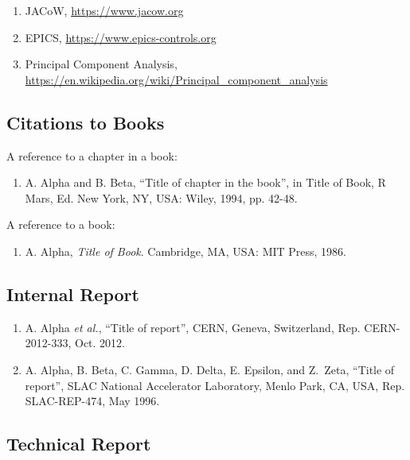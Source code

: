 \documentclass[%
               hyphens,       %
               ]{jacow}
\begin{document}
\begin{enumerate}[leftmargin=22pt, resume*]
	\item JACoW, \url{https://www.jacow.org}

	\item EPICS, \url{https://www.epics-controls.org}

	\item Principal Component Analysis, \\ 
		\url{https://en.wikipedia.org/wiki/Principal_component_analysis}
\end{enumerate}

\subsection{Citations to Books}
A reference to a chapter in a book:
\begin{enumerate}[leftmargin=22pt, resume*]
	\item A. Alpha and B. Beta, 
		“Title of chapter in the book”, in Title of Book, 
		R Mars, Ed. New York, NY, USA: Wiley, 1994, pp. 42-48.
\end{enumerate}

A reference to a book:
\begin{enumerate}[leftmargin=22pt, resume*]
	\item A. Alpha, \textit{Title of Book}. 
		Cambridge, MA, USA: MIT Press, 1986.
\end{enumerate}

\subsection{Internal Report}

\begin{enumerate}[leftmargin=22pt, resume*]
	\item A. Alpha \textit{et al.}, “Title of report”, CERN, Geneva, Switzerland, 
		Rep. CERN-2012-333, Oct. 2012.

	\item A. Alpha, B. Beta, C. Gamma, D. Delta, E. Epsilon, and Z.~Zeta, 
		“Title of report”, SLAC National Accelerator Laboratory, Menlo Park, CA, USA, Rep. SLAC-REP-474, May 1996.
\end{enumerate}

\flushcolsend
\subsection{Technical Report}
\end{document}
